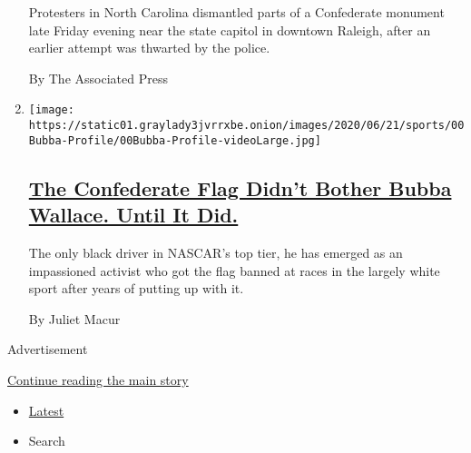 \begin{enumerate}
  Protesters in North Carolina dismantled parts of a Confederate
  monument late Friday evening near the state capitol in downtown
  Raleigh, after an earlier attempt was thwarted by the police.

  By The Associated Press
\item
  \texttt{[image: https://static01.graylady3jvrrxbe.onion/images/2020/06/21/sports/00Bubba-Profile/00Bubba-Profile-videoLarge.jpg]}

  \hypertarget{the-confederate-flag-didnt-bother-bubba-wallace-until-it-did}{%
  \subsection{\texorpdfstring{\href{/2020/06/19/sports/autoracing/bubba-wallace-nascar-black-lives-matter-confederate-flag.html}{The
  Confederate Flag Didn't Bother Bubba Wallace. Until It
  Did.}}{The Confederate Flag Didn't Bother Bubba Wallace. Until It Did.}}\label{the-confederate-flag-didnt-bother-bubba-wallace-until-it-did}}

  The only black driver in NASCAR's top tier, he has emerged as an
  impassioned activist who got the flag banned at races in the largely
  white sport after years of putting up with it.

  By Juliet Macur
\end{enumerate}

Advertisement

\protect\hyperlink{after-mid1}{Continue reading the main story}

\begin{itemize}
\tightlist
\item
  \protect\hyperlink{stream-panel}{Latest}
\item
  Search
\end{itemize}

